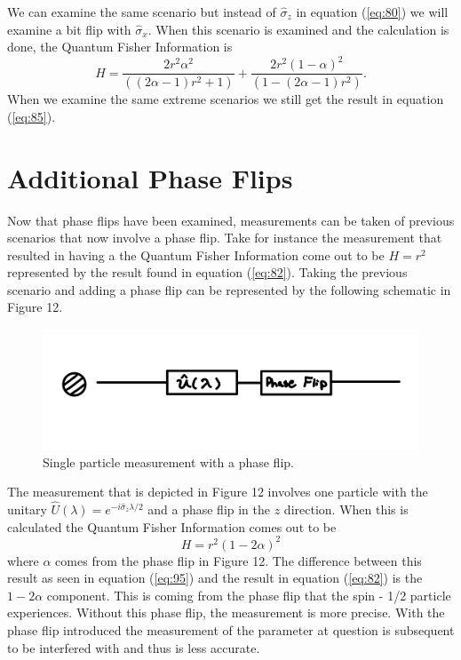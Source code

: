 \documentclass[twocolumn]{article}
\begin{document}
We can examine the same scenario but instead of $\hat{\sigma}_z$ in equation (\ref{eq:80}) we will examine a bit flip with $\hat{\sigma}_x$. When this scenario is examined and the calculation is done, the Quantum Fisher Information is
\begin{equation}\label{eq:94}
H=\frac{2r^2\alpha^2}{((2\alpha-1)r^2+1)}+\frac{2r^2(1-\alpha)^2}{(1-(2\alpha-1)r^2)}.
\end{equation}
When we examine the same extreme scenarios we still get the result in equation (\ref{eq:85}).
\section*{Additional Phase Flips}
Now that phase flips have been examined, measurements can be taken of previous scenarios that now involve a phase flip. Take for instance the measurement that resulted in having a the Quantum Fisher Information come out to be $H=r^2$ represented by the result found in equation (\ref{eq:82}). Taking the previous scenario and adding a phase flip can be represented by the following schematic in Figure 12.
\begin{figure}[h]
\begin{center}
\includegraphics[width=0.70\linewidth]{SP-Phase-Flip.PNG}
\caption{Single particle measurement with a phase flip.}
\end{center}
\end{figure}
\newline
The measurement that is depicted in Figure 12 involves one particle with the unitary $\hat{U}(\lambda)=e^{-i\hat{\sigma}_z\lambda/2}$ and a phase flip in the $z$ direction. When this is calculated the Quantum Fisher Information comes out to be
\begin{equation}\label{eq:95}
H=r^2(1-2\alpha)^2
\end{equation}
where $\alpha$ comes from the phase flip in Figure 12. The difference between this result as seen in equation (\ref{eq:95}) and the result in equation (\ref{eq:82}) is the $1-2\alpha$ component. This is coming from the phase flip that the spin - 1/2 particle experiences. Without this phase flip, the measurement is more precise. With the phase flip introduced the measurement of the parameter at question is subsequent to be interfered with and thus is less accurate.
\end{document}
